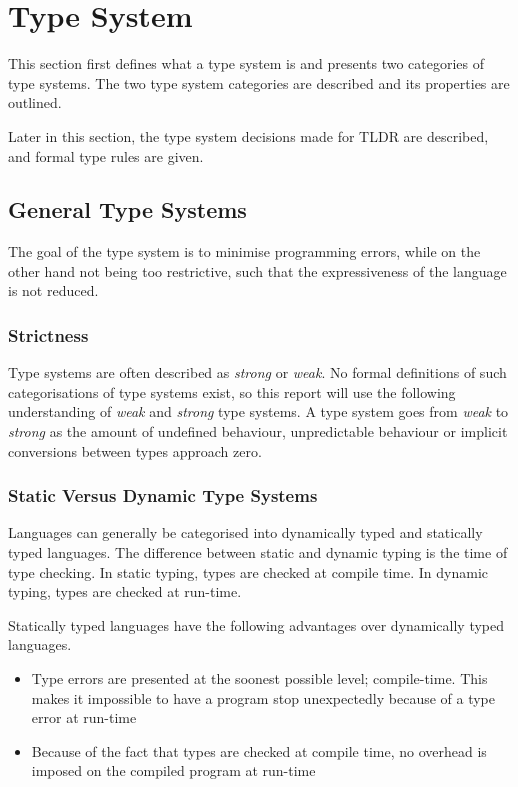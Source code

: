 \section{Type System}\label{typesys}

This section first defines what a type system is and presents two categories of type systems. The two type system categories are described and its properties are outlined.

Later in this section, the type system decisions made for TLDR are described, and formal type rules are given.

\subsection{General Type Systems}

The goal of the type system is to minimise programming errors, while on the other hand not being too restrictive, such that the expressiveness of the language is not reduced. 

\subsubsection{Strictness}
Type systems are often described as \emph{strong} or \emph{weak}. No formal definitions of such categorisations of type systems exist, so this report will use the following understanding of \emph{weak} and \emph{strong} type systems. A type system goes from \emph{weak} to \emph{strong} as the amount of undefined behaviour, unpredictable behaviour or implicit conversions between types approach zero.

\subsubsection{Static Versus Dynamic Type Systems}
Languages can generally be categorised into dynamically typed and statically typed languages. The difference between static and dynamic typing is the time of type checking. In static typing, types are checked at compile time. In dynamic typing, types are checked at run-time.

Statically typed languages have the following advantages over dynamically typed languages.

\begin{itemize}
  \item Type errors are presented at the soonest possible level; compile-time. This makes it impossible to have a program stop unexpectedly because of a type error at run-time
  \item Because of the fact that types are checked at compile time, no overhead is imposed on the compiled program at run-time
\end{itemize}

